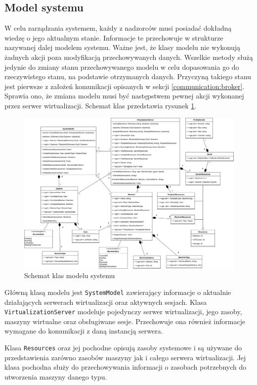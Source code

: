 \documentclass[../opis-rozwiazania.tex]{subfiles}
\begin{document}
\subsection{Model systemu}

W celu zarządzania systemem, każdy z nadzorców musi posiadać dokładną wiedzę o jego aktualnym stanie. Informacje te przechowuje w strukturze nazywanej dalej modelem systemu. Ważne jest, że klasy modelu nie wykonują żadnych akcji poza modyfikacją przechowywanych danych. Wszelkie metody służą jedynie do zmiany stanu przechowywanego modelu w celu dopasowania go do rzeczywistego stanu, na podstawie otrzymanych danych. Przyczyną takiego stanu jest pierwsze z założeń komunikacji opisanych w sekcji \ref{communication:broker}. Sprawia ono, że zmiana modelu musi być następstwem pewnej akcji wykonanej przez serwer wirtualizacji. Schemat klas przedstawia rysunek \ref{figure:architecture:model}.

\begin{figure}[h]
  \centering
  \includegraphics[width=\textwidth]{../diagrams/class_diagrams/system_model_v2.png}
  \caption{Schemat klas modelu systemu}
  \label{figure:architecture:model}
\end{figure}

Główną klasą modelu jest \texttt{SystemModel} zawierający informacje o aktualnie działających serwerach wirtualizacji oraz aktywnych sesjach. Klasa \texttt{VirtualizationServer} modeluje pojedynczy serwer wirtualizacji, jego zasoby, maszyny wirtualne oraz obsługiwane sesje. Przechowuje ona również informacje wymagane do komunikacji z daną instancją serwera.

Klasa \texttt{Resources} oraz jej pochodne opisują zasoby systemowe i są używane do przedstawienia zarówno zasobów maszyny jak i całego serwera wirtualizacji. Jej klasa pochodna \texttt{} służy do przechowywania informacji o zasobach potrzebnych do utworzenia maszyny danego typu.
\end{document}
